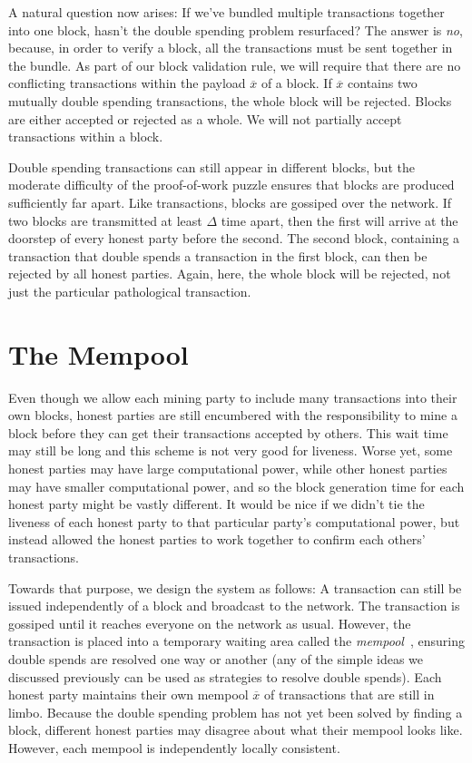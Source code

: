 A natural question now arises: If we've bundled multiple transactions together into one block,
hasn't the double spending problem resurfaced? The answer is \emph{no}, because, in order to
verify a block, all the transactions must be sent together in the bundle. As part of our block
validation rule, we will require that there are no conflicting transactions within the payload
$\overline{x}$ of a block. If $\overline{x}$ contains two mutually double spending transactions,
the whole block will be rejected. Blocks are either accepted or rejected as a whole. We will not
partially accept transactions within a block.

Double spending transactions can still appear in different blocks, but the moderate difficulty
of the proof-of-work puzzle ensures that blocks are produced sufficiently far apart. Like
transactions, blocks are gossiped over the network. If two blocks are transmitted at least
$\Delta$ time apart, then the first will arrive at the doorstep of every honest party before
the second. The second block, containing a transaction that double spends a transaction in the
first block, can then be rejected by all honest parties. Again, here, the whole block will be
rejected, not just the particular pathological transaction.

\section{The Mempool}

Even though we allow each mining party to include many transactions into their own blocks,
honest parties are still encumbered with the responsibility to mine a block before they can
get their transactions accepted by others. This wait time may still be long and this scheme
is not very good for liveness. Worse yet, some honest parties may have large computational
power, while other honest parties may have smaller computational power, and so the block
generation time for each honest party might be vastly different. It would be nice if we didn't
tie the liveness of each honest party to that particular party's computational power, but
instead allowed the honest parties to work together to confirm each others' transactions.

Towards that purpose, we design the system as follows: A transaction can still be issued
independently of a block and broadcast to the network. The transaction is gossiped until
it reaches everyone on the network as usual. However, the transaction is placed into a
temporary waiting area called the \emph{mempool}~, ensuring double spends are
resolved one way or another (any of the simple ideas we discussed previously can be used as
strategies to resolve double spends).
Each honest party maintains their own mempool $\overline{x}$ of transactions that are still in limbo.
Because the double spending problem has not yet been solved by finding a block, different
honest parties may disagree about what their mempool looks like.
However, each mempool is independently locally consistent.


